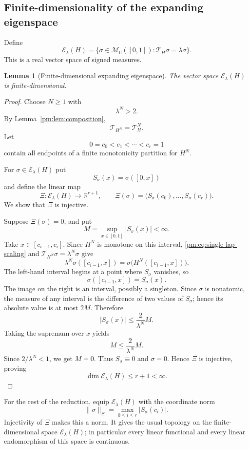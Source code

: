 \documentclass[11pt]{article}
\newtheorem{lemma}[theorem]{Lemma}
\theoremstyle{definition}
\theoremstyle{remark}
\newcommand{\I}{[0,1]}
\newcommand{\M}{\mathcal M_0}
\newcommand{\T}{\mathcal T}
\begin{document}
\subsection{Finite-dimensionality of the expanding eigenspace}

Define
\[
 \mathscr E_\lambda(H)
 =\{\sigma\in\M(\I):\T_H\sigma=\lambda\sigma\}.
\]
This is a real vector space of signed measures.

\begin{lemma}[Finite-dimensional expanding eigenspace]
\label{pm:lem:finite-dimensional}
The vector space $\mathscr E_\lambda(H)$ is finite-dimensional.
\end{lemma}

\begin{proof}
Choose $N\geq1$ with
\[
 \lambda^N>2.
\]
By Lemma~\ref{pm:lem:composition},
\[
 \T_{H^N}=\T_H^N.
\]
Let
\[
 0=c_0<c_1<\cdots<c_r=1
\]
contain all endpoints of a finite monotonicity partition for $H^N$.

For $\sigma\in\mathscr E_\lambda(H)$ put
\[
 S_\sigma(x)=\sigma([0,x])
\]
and define the linear map
\[
 \Xi:\mathscr E_\lambda(H)\longrightarrow\mathbb R^{r+1},
 \qquad
 \Xi(\sigma)=\bigl(S_\sigma(c_0),\ldots,S_\sigma(c_r)\bigr).
\]
We show that $\Xi$ is injective.

Suppose $\Xi(\sigma)=0$, and put
\[
 M=\sup_{x\in\I}|S_\sigma(x)|<\infty.
\]
Take $x\in[c_{i-1},c_i]$.  Since $H^N$ is monotone on this interval,
\eqref{pm:eq:single-lap-scaling} and
$\T_{H^N}\sigma=\lambda^N\sigma$ give
\[
 \lambda^N\sigma([c_{i-1},x])
 =\sigma\bigl(H^N([c_{i-1},x])\bigr).
\]
The left-hand interval begins at a point where $S_\sigma$ vanishes, so
\[
 \sigma([c_{i-1},x])=S_\sigma(x).
\]
The image on the right is an interval, possibly a singleton.  Since
$\sigma$ is nonatomic, the measure of any interval is the difference of two
values of $S_\sigma$; hence its absolute value is at most $2M$.  Therefore
\[
 |S_\sigma(x)|\leq \frac{2}{\lambda^N}M.
\]
Taking the supremum over $x$ yields
\[
 M\leq\frac{2}{\lambda^N}M.
\]
Since $2/\lambda^N<1$, we get $M=0$.  Thus $S_\sigma\equiv0$ and
$\sigma=0$.  Hence $\Xi$ is injective, proving
\[
 \dim\mathscr E_\lambda(H)\leq r+1<\infty.
\]
\end{proof}

For the rest of the reduction, equip $\mathscr E_\lambda(H)$ with the
coordinate norm
\begin{equation}\label{pm:eq:Xi-norm}
 \|\sigma\|_\Xi
 =\max_{0\leq i\leq r}|S_\sigma(c_i)|.
\end{equation}
Injectivity of $\Xi$ makes this a norm.  It gives the usual topology on the
finite-dimensional space $\mathscr E_\lambda(H)$; in particular every
linear functional and every linear endomorphism of this space is
continuous.
\end{document}
